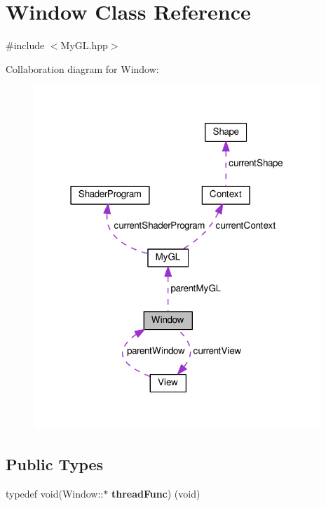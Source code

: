 \hypertarget{classWindow}{}\section{Window Class Reference}
\label{classWindow}


{\ttfamily \#include $<$My\+G\+L.\+hpp$>$}



Collaboration diagram for Window\+:
\nopagebreak
\begin{figure}[H]
\begin{center}
\leavevmode
\includegraphics[width=307pt]{classWindow__coll__graph}
\end{center}
\end{figure}
\subsection*{Public Types}
\begin{DoxyCompactItemize}
\item 
\hypertarget{classWindow_a1f4045bbf092073ad31043127af5e27d}{}typedef void(Window\+::$\ast$ {\bfseries thread\+Func}) (void)\label{classWindow_a1f4045bbf092073ad31043127af5e27d}

\end{DoxyCompactItemize}
